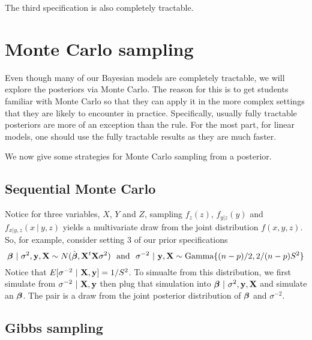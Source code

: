 The third specification is also completely tractable. 


\section{Monte Carlo sampling}

Even though many of our Bayesian models are completely tractable, we will explore the posteriors
via Monte Carlo. The reason for this is to get students familiar with Monte Carlo so that they
can apply it in the more complex settings that they are likely to encounter in practice. 
Specifically, usually fully tractable posteriors are more of an exception than the rule. For the
most part, for linear models, one should use the fully tractable results as they are much faster.

We now give some strategies for Monte Carlo sampling from a posterior.

\subsection{Sequential Monte Carlo}

Notice for three variables, $X$, $Y$ and $Z$, sampling $f_z(z)$, $f_{y|z}(y)$ and $f_{x|y,z}(x ~|~ y, z)$ yields a multivariate draw from the joint distribution $f(x, y, z)$. So, for example, consider
setting 3 of our prior specifications
$$
\boldsymbol{\beta} ~|~ \sigma^2, \mathbf{y}, \mathbf{X} \sim 
N(\hat {\boldsymbol{\beta}}, \mathbf{X}^t\mathbf{X} \sigma^2) ~~\mbox{and}~~
\sigma^{-2} ~|~ \mathbf{y}, \mathbf{X} \sim \mbox{Gamma}\{(n - p) / 2, 2 / (n - p) S^2\}
$$
Notice that $E[\sigma^{-2} ~|~ \mathbf{X}, \mathbf{y}] = 1 / S^2$. To simualte from this distribution,
we first simulate from $\sigma^{-2} ~|~ \mathbf{X}, \mathbf{y}$ 
then plug that simulation into $\boldsymbol{\beta} ~|~ \sigma^2, \mathbf{y}, \mathbf{X}$
and simulate an $\boldsymbol{\beta}$. The pair is a draw from the joint posterior 
distribution of $\boldsymbol{\beta}$ and $\sigma^{-2}$.

\subsection{Gibbs sampling}

